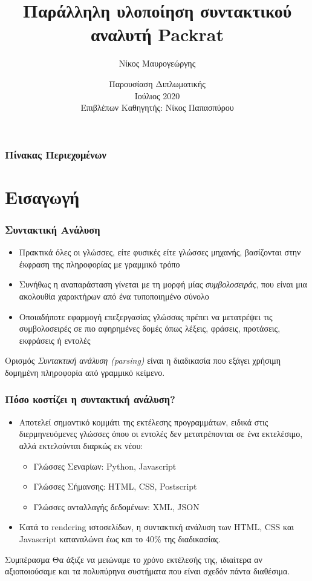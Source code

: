 \documentclass{beamer}
\title[Παράλληλη υλοποίηση συντακτικού αναλυτή Packrat] %
{Παράλληλη υλοποίηση συντακτικού αναλυτή Packrat}
\author[Νίκος, Μαυρογεώργης] %
{Νίκος Μαυρογεώργης}
\institute[ECE, NTUA] %
{
  Σχολή Ηλεκτρολόγων Μηχανικών και Μηχανικών Υπολογιστών\\
  Εθνικό Μετσόβειο Πολυτεχνείο
}
\date[NTUA 2020] %
{Παρουσίαση Διπλωματικής \\ Ιούλιος 2020 \\ Επιβλέπων Καθηγητής: Νίκος Παπασπύρου}
\begin{document}
\frame{\titlepage}

\begin{frame}
\frametitle{Πίνακας Περιεχομένων}
\tableofcontents
\end{frame}

\section{Εισαγωγή}

\begin{frame}
  \frametitle{Συντακτική Ανάλυση}
  \begin{itemize}	
	\item Πρακτικά όλες οι γλώσσες, είτε φυσικές είτε γλώσσες μηχανής, βασίζονται στην έκφραση της πληροφορίας με γραμμικό τρόπο
	\item Συνήθως η αναπαράσταση γίνεται με τη μορφή μίας \textit{συμβολοσειράς}, που είναι μια ακολουθία χαρακτήρων από ένα τυποποιημένο σύνολο
	\item Οποιαδήποτε εφαρμογή επεξεργασίας γλώσσας πρέπει να μετατρέψει τις συμβολοσειρές σε πιο αφηρημένες δομές όπως λέξεις, φράσεις, προτάσεις, εκφράσεις ή εντολές \pause
  \end{itemize}

\begin{block}{Ορισμός}
  \textit{Συντακτική ανάλυση (parsing)} είναι η διαδικασία που εξάγει χρήσιμη δομημένη πληροφορία από γραμμικό κείμενο.
\end{block}

\end{frame}

\begin{frame}
  \frametitle{Πόσο κοστίζει η συντακτική ανάλυση?} \pause
  \begin{itemize}
	\item Αποτελεί σημαντικό κομμάτι της εκτέλεσης προγραμμάτων, ειδικά στις διερμηνευόμενες γλώσσες όπου οι εντολές δεν μετατρέπονται σε ένα εκτελέσιμο, αλλά εκτελούνται διαρκώς εκ νέου:
  \begin{itemize}
	\item Γλώσσες Σεναρίων: Python, Javascript
	\item Γλώσσες Σήμανσης: HTML, CSS, Postscript
	\item Γλώσσες ανταλλαγής δεδομένων: XML, JSON \pause
  \end{itemize}
\item Κατά το rendering ιστοσελίδων, η συντακτική ανάλυση των HTML, CSS και Javascript καταναλώνει έως και το 40\% της διαδικασίας. \pause
  \end{itemize}

  \begin{block}{Συμπέρασμα}
	Θα άξιζε να μειώναμε το χρόνο εκτέλεσής της, ιδιαίτερα αν αξιοποιούσαμε και τα πολυπύρηνα συστήματα που είναι σχεδόν πάντα διαθέσιμα.
  \end{block}
\end{frame}
\end{document}
